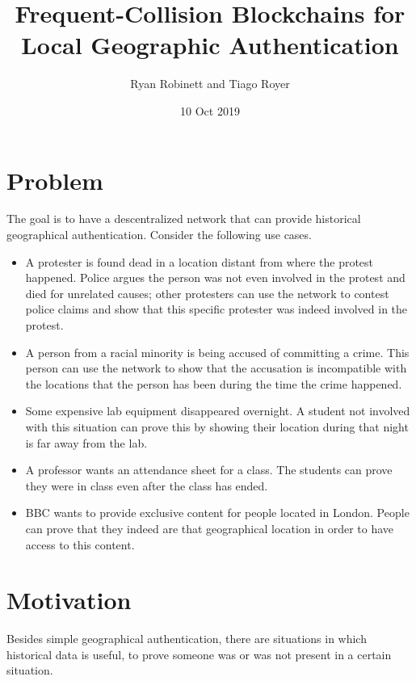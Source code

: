 \documentclass{article}
\title{Frequent-Collision Blockchains for Local Geographic Authentication}
\author{Ryan Robinett and Tiago Royer}
\date{10 Oct 2019}
\begin{document}
\maketitle

\section*{Problem}

The goal is to have a descentralized network
that can provide historical geographical authentication.
Consider the following use cases.

\begin{itemize}
	\item A protester is found dead in a location distant from where the protest happened.
		Police argues the person was not even involved in the protest
		and died for unrelated causes;
		other protesters can use the network to contest police claims
		and show that this specific protester was indeed involved in the protest.

	\item A person from a racial minority is being accused of committing a crime.
		This person can use the network to show that the accusation
		is incompatible with the locations that the person has been
		during the time the crime happened.

	\item Some expensive lab equipment disappeared overnight.
		A student not involved with this situation
		can prove this by showing their location during that night
		is far away from the lab.

	\item A professor wants an attendance sheet for a class.
		The students can prove they were in class
		even after the class has ended.

	\item BBC wants to provide exclusive content for people located in London.
		People can prove that they indeed are that geographical location
		in order to have access to this content.
\end{itemize}


\section*{Motivation}

Besides simple geographical authentication,
there are situations in which historical data is useful,
to prove someone was or was not present in a certain situation.
\end{document}
